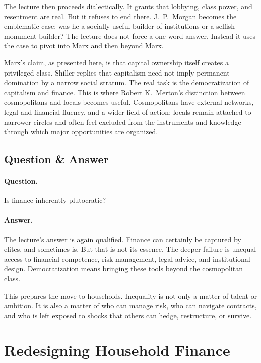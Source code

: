 The lecture then proceeds dialectically. It grants that lobbying, class power, and resentment are real. But it refuses to end there. J.\ P.\ Morgan becomes the emblematic case: was he a socially useful builder of institutions or a selfish monument builder? The lecture does not force a one-word answer. Instead it uses the case to pivot into Marx and then beyond Marx.

Marx's claim, as presented here, is that capital ownership itself creates a privileged class. Shiller replies that capitalism need not imply permanent domination by a narrow social stratum. The real task is the democratization of capitalism and finance. This is where Robert K.\ Merton's distinction between cosmopolitans and locals becomes useful. Cosmopolitans have external networks, legal and financial fluency, and a wider field of action; locals remain attached to narrower circles and often feel excluded from the instruments and knowledge through which major opportunities are organized.

\subsection{Question \& Answer}

\paragraph{Question.} Is finance inherently plutocratic?

\paragraph{Answer.} The lecture's answer is again qualified. Finance can certainly be captured by elites, and sometimes is. But that is not its essence. The deeper failure is unequal access to financial competence, risk management, legal advice, and institutional design. Democratization means bringing these tools beyond the cosmopolitan class.

This prepares the move to households. Inequality is not only a matter of talent or ambition. It is also a matter of who can manage risk, who can navigate contracts, and who is left exposed to shocks that others can hedge, restructure, or survive.

\section{Redesigning Household Finance}

